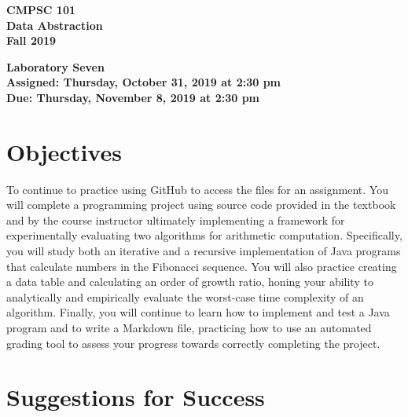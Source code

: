 \documentclass[11pt]{article}
\newcommand{\assignmentduedate}{November 8}
\newcommand{\assignmentassignedate}{October 31}
\newcommand{\assignmentnumber}{Seven}
\newcommand{\labyear}{2019}
\newcommand{\labday}{Thursday}
\newcommand{\labtime}{2:30 pm}
\newcommand{\assigneddate}{Assigned: \labday, \assignmentassignedate, \labyear{} at \labtime{}}
\newcommand{\duedate}{Due: \labday, \assignmentduedate, \labyear{} at \labtime{}}
\newcommand{\labtitle}[1]
{
  \begin{center}
    \begin{center}
      \bf
      CMPSC 101\\Data Abstraction\\
      Fall 2019\\
      \medskip
    \end{center}
    \bf
    #1
  \end{center}
}
\begin{document}
\thispagestyle{empty}

\labtitle{Laboratory \assignmentnumber{} \\ \assigneddate{} \\ \duedate{}}

\section*{Objectives}

To continue to practice using GitHub to access the files for an assignment. You
will complete a programming project using source code provided in the textbook
and by the course instructor ultimately implementing a framework for
experimentally evaluating two algorithms for arithmetic computation.
Specifically, you will study both an iterative and a recursive implementation of
Java programs that calculate numbers in the Fibonacci sequence. You will also
practice creating a data table and calculating an order of growth ratio, honing
your ability to analytically and empirically evaluate the worst-case time
complexity of an algorithm. Finally, you will continue to learn how to implement
and test a Java program and to write a Markdown file, practicing how to use an
automated grading tool to assess your progress towards correctly completing the
project.

\section*{Suggestions for Success}
\end{document}
